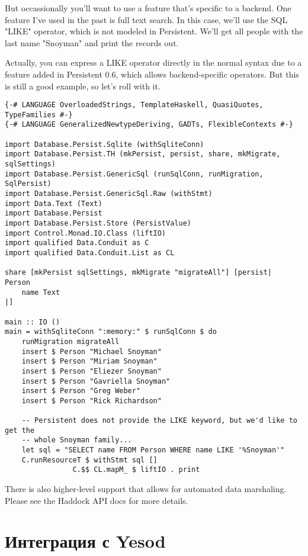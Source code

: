 But occassionally you'll want to use a feature that's specific to a backend. One feature I've used in the past is full text search. In this case, we'll use the SQL "LIKE" operator, which is not modeled in Persistent. We'll get all people with the last name "Snoyman" and print the records out.

Actually, you can express a LIKE operator directly in the normal syntax due to a feature added in Persistent 0.6, which allows backend-specific operators. But this is still a good example, so let's roll with it.

\begin{lstlisting}
{-# LANGUAGE OverloadedStrings, TemplateHaskell, QuasiQuotes, TypeFamilies #-}
{-# LANGUAGE GeneralizedNewtypeDeriving, GADTs, FlexibleContexts #-}

import Database.Persist.Sqlite (withSqliteConn)
import Database.Persist.TH (mkPersist, persist, share, mkMigrate, sqlSettings)
import Database.Persist.GenericSql (runSqlConn, runMigration, SqlPersist)
import Database.Persist.GenericSql.Raw (withStmt)
import Data.Text (Text)
import Database.Persist
import Database.Persist.Store (PersistValue)
import Control.Monad.IO.Class (liftIO)
import qualified Data.Conduit as C
import qualified Data.Conduit.List as CL

share [mkPersist sqlSettings, mkMigrate "migrateAll"] [persist|
Person
    name Text
|]

main :: IO ()
main = withSqliteConn ":memory:" $ runSqlConn $ do
    runMigration migrateAll
    insert $ Person "Michael Snoyman"
    insert $ Person "Miriam Snoyman"
    insert $ Person "Eliezer Snoyman"
    insert $ Person "Gavriella Snoyman"
    insert $ Person "Greg Weber"
    insert $ Person "Rick Richardson"

    -- Persistent does not provide the LIKE keyword, but we'd like to get the
    -- whole Snoyman family...
    let sql = "SELECT name FROM Person WHERE name LIKE '%Snoyman'"
    C.runResourceT $ withStmt sql []
                C.$$ CL.mapM_ $ liftIO . print
\end{lstlisting}

There is also higher-level support that allows for automated data marshaling. Please see the Haddock API docs for more details.

\section{Интеграция с Yesod} %

